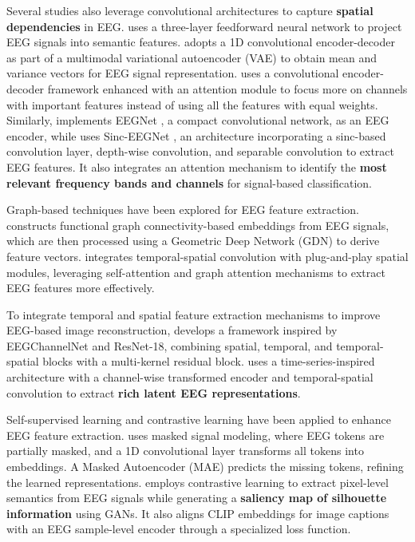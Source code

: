 Several studies also leverage convolutional architectures to capture \textbf{spatial dependencies} in EEG. \citet{li2020semi} uses a three-layer feedforward neural network to project EEG signals into semantic features. \citet{wakita2021photorealistic} adopts a 1D convolutional encoder-decoder as part of a multimodal variational autoencoder (VAE) to obtain mean and variance vectors for EEG signal representation. \citet{mishra2023neurogan} uses a convolutional encoder-decoder framework enhanced with an attention module to focus more on channels with important features instead of using all the features with equal weights. Similarly, \citet{sugimoto2024image} implements EEGNet \cite{lawhern2018eegnet}, a compact convolutional network, as an EEG encoder, while \citet{li2024visual} uses Sinc-EEGNet \cite{bria2021sinc}, an architecture incorporating a sinc-based convolution layer, depth-wise convolution, and separable convolution to extract EEG features. It also integrates an attention mechanism to identify the \textbf{most relevant frequency bands and channels} for signal-based classification.

Graph-based techniques have been explored for EEG feature extraction. \citet{khaleghi2022visual} constructs functional graph connectivity-based embeddings from EEG signals, which are then processed using a Geometric Deep Network (GDN) to derive feature vectors. \citet{song2023decoding} integrates temporal-spatial convolution with plug-and-play spatial modules, leveraging self-attention and graph attention mechanisms to extract EEG features more effectively.

To integrate temporal and spatial feature extraction mechanisms to improve EEG-based image reconstruction, \citet{zeng2023dm} develops a framework inspired by EEGChannelNet \cite{palazzo2020decoding} and ResNet-18, combining spatial, temporal, and temporal-spatial blocks with a multi-kernel residual block. \citet{shimizu2022improving} uses a time-series-inspired architecture with a channel-wise transformed encoder and temporal-spatial convolution to extract \textbf{rich latent EEG representations}.

Self-supervised learning and contrastive learning have been applied to enhance EEG feature extraction. \citet{bai2306dreamdiffusion} uses masked signal modeling, where EEG tokens are partially masked, and a 1D convolutional layer transforms all tokens into embeddings. A Masked Autoencoder (MAE) predicts the missing tokens, refining the learned representations. \citet{lan2023seeing} employs contrastive learning to extract pixel-level semantics from EEG signals while generating a \textbf{saliency map of silhouette information} using GANs. It also aligns CLIP embeddings for image captions with an EEG sample-level encoder through a specialized loss function.

